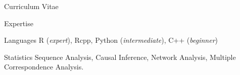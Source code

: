 \documentclass[12pt,a4paper]{article}
\newcommand*{\ac}[1]{\mbox{#1}}
\begin{document}
\begin{cv}{Curriculum Vitae}
\begin{cvlist}{\ac{Expertise}}
	\item[Languages] R (\emph{expert}), Rcpp, Python (\emph{intermediate}),  C++ (\emph{beginner}) 
	
	\item[Statistics] Sequence Analysis, Causal Inference, Network Analysis, Multiple Correspondence Analysis.
	
\end{cvlist}

  \date{~March~2020}
\end{cv}
\end{document}
